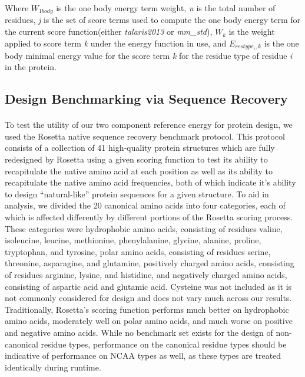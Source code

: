 Where $W_{1body}$ is the one body energy term weight, \textit{n} is the total number of residues, \textit{j} is the set of score terms used to compute the one body energy term for the current score function(either \textit{talaris2013} or \textit{mm\_std}), $W_{k}$ is the weight applied to score term \textit{k} under the energy function in use, and $E_{restype_{i},k}$ is the one body minimal energy value for the score term \textit{k} for the residue type of residue \textit{i} in the protein.


\subsection{Design Benchmarking via Sequence Recovery}
\paragraph{}
To test the utility of our two component reference energy for protein design, we used the Rosetta native sequence recovery benchmark protocol\cite{leaver-fay_chapter_2013}.
This protocol consists of a collection of 41 high-quality protein structures which are fully redesigned by Rosetta using a given scoring function to test its ability to recapitulate the native amino acid at each position as well as its ability to recapitulate the native amino acid frequencies, both of which indicate it's ability to design ``natural-like'' protein sequences for a given structure.
To aid in analysis, we divided the 20 canonical amino acids into four categories, each of which is affected differently by different portions of the Rosetta scoring process.
These categories were hydrophobic amino acids, consisting of residues valine, isoleucine, leucine, methionine, phenylalanine, glycine, alanine, proline, tryptophan, and tyrosine, polar amino acids, consisting of residues serine, threonine, asparagine, and glutamine, positively charged amino acids, consisting of residues arginine, lysine, and histidine, and negatively charged amino acids, consisting of aspartic acid and glutamic acid.
Cysteine was not included as it is not commonly considered for design and does not vary much across our results.
Traditionally, Rosetta's scoring function performs much better on hydrophobic amino acids, moderately well on polar amino acids, and much worse on positive and negative amino acids.
While no benchmark set exists for the design of non-canonical residue types, performance on the canonical residue types should be indicative of performance on NCAA types as well, as these types are treated identically during runtime.

